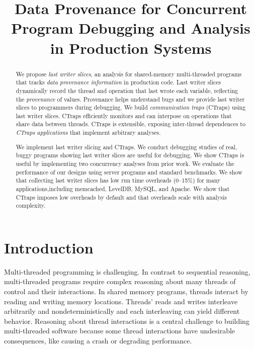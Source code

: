 \documentclass[preprint,9pt]{sigplanconf}
\title{Data Provenance for Concurrent Program Debugging and Analysis in Production Systems}
\newcommand{\ctraps}{CTraps\xspace}
\begin{document}
\maketitle

\begin{abstract}
We propose {\em last writer slices}, an analysis for shared-memory
multi-threaded programs that tracks {\em data provenance information} in
production code.  Last writer slices dynamically record the thread and
operation that last wrote each variable, reflecting the {\em provenance} of
values.  Provenance helps understand bugs and we provide last writer slices to
programmers during debugging.  We build {\em communication traps}
(\ctraps) using last writer slices.  \ctraps efficiently
monitors and can interpose on operations that share data between
threads.  \ctraps is extensible, exposing inter-thread dependences
to {\em \ctraps applications} that implement arbitrary analyses.  

We implement last writer slicing and \ctraps.  We conduct debugging studies of
real, buggy programs showing last writer slices are useful for debugging.  We
show \ctraps is useful by implementing two concurrency analyses from prior
work.  We evaluate the performance of our designs using server programs
and standard benchmarks.  We show that collecting last writer slices
has low run time overheads (0--15\%) for many applications,including  
memcached, LevelDB, MySQL, and Apache.  We show that \ctraps imposes low 
overheads by default and that overheads scale with analysis complexity.

\end{abstract}

\section{Introduction}
Multi-threaded programming is challenging.  In contrast to 
sequential reasoning, multi-threaded programs require complex reasoning about
many threads of control and their interactions.  In shared memory programs,
threads interact by reading and writing memory locations.  Threads' reads and
writes interleave arbitrarily and nondeterministically and each interleaving
can yield different behavior.  Reasoning about thread interactions is a central
challenge to building multi-threaded software because some thread interactions
have undesirable consequences, like causing a crash or degrading performance.
\end{document}
